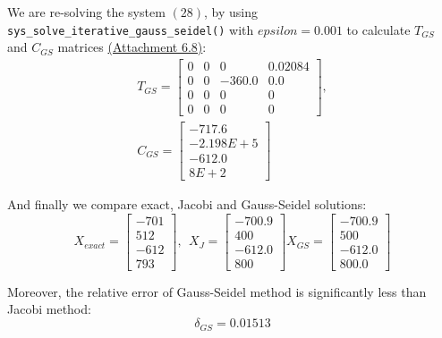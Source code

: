 \documentclass[letterpaper,12pt]{article}
\begin{document}
We are re-solving the system $(28)$, by using \verb|sys_solve_iterative_gauss_seidel()| with $epsilon=0.001$ to calculate $T_{GS}$ and $C_{GS}$ matrices \hyperref[a:E8]{(Attachment 6.8)}:
\begin{equation}
    \begin{array}{l}
        T_{GS} =
        \begin{bmatrix}
            0      &       0      &       0        &     0.02084\\
            0      &       0      &       -360.0   &     0.0\\
            0      &       0      &       0        &     0\\
            0      &       0      &       0      &     0 
        \end{bmatrix},\\
        C_{GS} = 
        \begin{bmatrix}
            -717.6\\
            -2.198E+5\\
            -612.0\\
            8E+2 
        \end{bmatrix}
    \end{array}
\end{equation}

And finally we compare exact, Jacobi and Gauss-Seidel solutions:
\begin{equation}
    X_{exact} = 
    \begin{bmatrix}
        -701\\
        512\\
        -612\\
        793
    \end{bmatrix}, \ \
    X_{J} = 
    \begin{bmatrix}
         -700.9\\
         400\\
         -612.0\\
         800 
    \end{bmatrix}
    X_{GS} = 
    \begin{bmatrix}
         -700.9\\
         500\\
         -612.0\\
         800.0
    \end{bmatrix}
\end{equation}

Moreover, the relative error of Gauss-Seidel method is significantly less than Jacobi method:
\begin{equation}
    \delta_{GS} = 0.01513
\end{equation}
\end{document}

